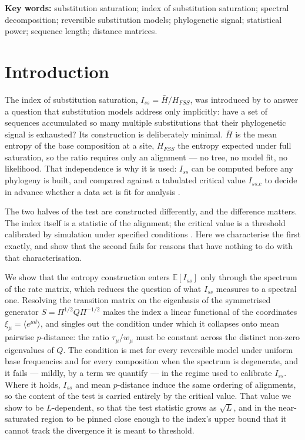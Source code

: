 \documentclass[11pt]{article}
\newcommand{\Iss}{I_{ss}}
\newcommand{\Issc}{I_{ss.c}}
\newcommand{\Hbar}{\bar H}
\newcommand{\HFSS}{H_{FSS}}
\newcommand{\E}{\mathbb{E}}
\theoremstyle{definition}
\theoremstyle{remark}
\begin{document}
\vspace{0.4em}
\noindent\textbf{Key words:} substitution saturation; index of substitution
saturation; spectral decomposition; reversible substitution models;
phylogenetic signal; statistical power; sequence length; distance matrices.

\section{Introduction}

The index of substitution saturation, $\Iss=\Hbar/\HFSS$, was introduced by
\citet{xia2003iss} to answer a question that substitution models address only
implicitly: have a set of sequences accumulated so many multiple substitutions
that their phylogenetic signal is exhausted? Its construction is deliberately
minimal. $\Hbar$ is the mean entropy of the base composition at a site,
$\HFSS$ the entropy expected under full saturation, so the ratio requires only
an alignment --- no tree, no model fit, no likelihood. That independence is why
it is used: $\Iss$ can be computed before any phylogeny is built, and compared
against a tabulated critical value $\Issc$ to decide in advance whether a data
set is fit for analysis \citep{xia2003iss,xia2009handbook}.

The two halves of the test are constructed differently, and the difference
matters. The index itself is a statistic of the alignment; the critical value
is a threshold calibrated by simulation under specified conditions
\citep{xia2003iss}. Here we characterise the first exactly, and show that the
second fails for reasons that have nothing to do with that characterisation.

We show that the entropy construction enters $\E[\Iss]$ only through the
spectrum of the rate matrix, which reduces the question of what $\Iss$ measures
to a spectral one. Resolving the transition matrix on the eigenbasis of the
symmetrised generator $S=\Pi^{1/2}Q\Pi^{-1/2}$ makes the index a linear
functional of the coordinates $\xi_\mu=\langle e^{\mu d}\rangle$, and singles
out the condition under which it collapses onto mean pairwise $p$-distance:
the ratio $\tau_\mu/w_\mu$ must be constant across the distinct non-zero
eigenvalues of $Q$. The condition is met for every reversible model under
uniform base frequencies and for every composition when the spectrum is
degenerate, and it fails --- mildly, by a term we quantify --- in the
regime used to calibrate $\Iss$. Where it holds, $\Iss$ and mean
$p$-distance induce the same ordering of alignments, so the content of the
test is carried entirely by the critical value. That value we show to be
$L$-dependent, so that the test statistic grows as $\sqrt{L}$, and in the
near-saturated region to be pinned close enough to the index's upper bound
that it cannot track the divergence it is meant to threshold.
\end{document}
